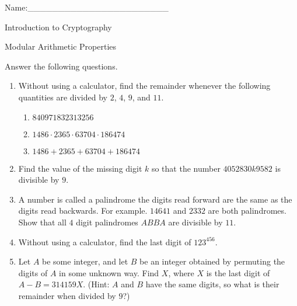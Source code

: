 \documentclass[12pt]{amsart}
\theoremstyle{definition}
\theoremstyle{remark}
\numberwithin{equation}{section}
\begin{document}
\begin{flushright}
Name:\_\_\_\_\_\_\_\_\_\_\_\_\_\_\_\_\_\_\_\_\_\_\_
\end{flushright}
\vspace{10pt}
\begin{center}
Introduction to Cryptography

Modular Arithmetic Properties
\end{center}

Answer the following questions.

\begin{enumerate}
\item Without using a calculator, find the remainder whenever the following quantities are divided by $2$, $4$, $9$, and $11$.
\begin{enumerate}
\item $840971832313256$
\item $1486\cdot2365\cdot63704\cdot186474$
\item $1486+2365+63704+186474$
\end{enumerate}
\vspace{2pt}
\item Find the value of the missing digit $k$ so that the number $4052830k9582$ is divisible by $9$.
\vspace{2pt}
\item A number is called a palindrome the digits read forward are the same as the digits read backwards. For example. $14641$ and $2332$ are both palindromes. Show that all $4$ digit palindromes $ABBA$ are divisible by $11$. 
\vspace{2pt}
\item Without using a calculator, find the last digit of $123^{456}$.
\vspace{2pt}
\item Let $A$ be some integer, and let $B$ be an integer obtained by permuting the digits of $A$ in some unknown way. Find $X$, where $X$ is the last digit of $A-B=314159X$. (Hint: $A$ and $B$ have the same digits, so what is their remainder when divided by $9$?)
\end{enumerate}
\vfill
\end{document}
